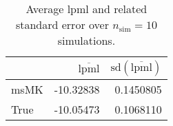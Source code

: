 \begin{table}[H]

\caption{Average lpml and related standard error over $n_{\text{sim}} = 10$ simulations.}
\centering
\begin{tabular}[t]{lrr}
\toprule
  & $\overbar{\text{lpml}}$ & $\text{sd}(\overbar{\text{lpml}})$\\
\midrule
msMK & -10.32838 & 0.1450805\\
True & -10.05473 & 0.1068110\\
\bottomrule
\end{tabular}
\end{table}